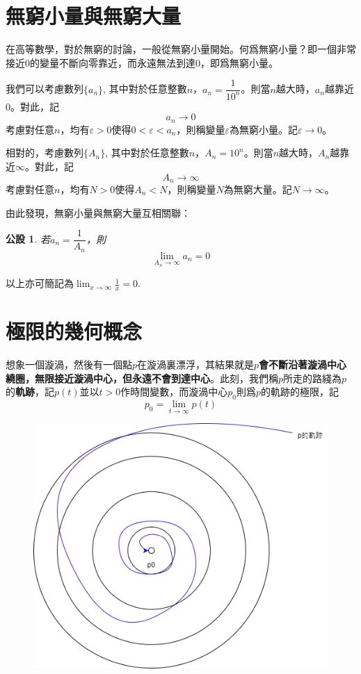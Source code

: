 \documentclass[12pt]{article}
\newtheorem*{axiom}{公設}
\begin{document}
    \section*{無窮小量與無窮大量}
    
    在高等數學，對於無窮的討論，一般從無窮小量開始。何爲無窮小量？即一個非常接近0的變量不斷向零靠近，而永遠無法到達0，即爲無窮小量。

    我們可以考慮數列$\{a_n\}$, 其中對於任意整數$n$，$a_n=\dfrac{1}{10^n}$。則當$n$越大時，$a_n$越靠近0。對此，記$$a_n\to 0$$考慮對任意$n$，均有$\varepsilon>0$使得$0<\varepsilon<a_n$，則稱變量$\varepsilon$為無窮小量。記$\varepsilon\to 0$。

    相對的，考慮數列$\{A_n\}$, 其中對於任意整數$n$，$A_n=10^n$。則當$n$越大時，$A_n$越靠近$\infty$。對此，記$$A_n\to \infty$$考慮對任意$n$，均有$N>0$使得$A_n<N$，則稱變量$N$為無窮大量。記$N\to \infty$。

    由此發現，無窮小量與無窮大量互相關聯：

    \begin{axiom}
        若$a_n=\dfrac{1}{A_n}$，則$$\lim_{A_n\to \infty}a_n=0$$ 
    \end{axiom}

    以上亦可簡記為$\displaystyle\lim_{x\to\infty}\frac{1}{x}=0$.

    \section*{極限的幾何概念}

    想象一個漩渦，然後有一個點$p$在漩渦裏漂浮，其結果就是\textbf{$p$會不斷沿著漩渦中心繞圈，無限接近漩渦中心，但永遠不會到達中心}。此刻，我們稱$p$所走的路綫為$p$的\textbf{軌跡}，記$p(t)$並以$t>0$作時間變數，而漩渦中心$p_0$則爲$p$的軌跡的極限，記$$p_0=\lim_{t\to\infty}p(t)$$

    \begin{figure}[H]
        \centering
        \includegraphics[scale=0.4]{limit1.png}
    \end{figure}    
\end{document}
